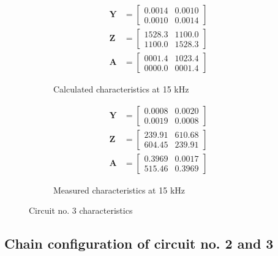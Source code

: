 \documentclass[notitlepage, a4paper, 11pt]{article}
\begin{document}
\begin{figure}[H]
		\begin{subfigure}{0.45\textwidth}
			\begin{align*}
				\mathbf{Y} &= 
				\begin{bmatrix}
				    0.0014  &  0.0010 \\
					0.0010  &  0.0014
				\end{bmatrix}
				\\
				\mathbf{Z} &= 
				\begin{bmatrix}
				    1528.3   & 1100.0 \\ 
					1100.0   & 1528.3
				\end{bmatrix}
				\\
				\mathbf{A} &= 
				\begin{bmatrix}
				    0001.4 &   1023.4 \\
					0000.0  &  0001.4
				\end{bmatrix}
			\end{align*}
			\caption{Calculated characteristics at 15 kHz}
		\end{subfigure}
		\hfill
				\begin{subfigure}{0.45\textwidth}
			\begin{align*}
				\mathbf{Y} &= 
				\begin{bmatrix}
					0.0008  &  0.0020\\
					0.0019  &  0.0008
				\end{bmatrix}
				\\
				\mathbf{Z} &= 
				\begin{bmatrix}
					239.91 & 610.68\\
					604.45 & 239.91
				\end{bmatrix}
				\\
				\mathbf{A} &=
				\begin{bmatrix}
					 0.3969  &  0.0017 \\
					515.46  &  0.3969
				\end{bmatrix} 
			\end{align*}
			\caption{Measured characteristics at 15 kHz}
		\end{subfigure}
		\caption{Circuit no. 3 characteristics}
	\end{figure}
	
	\subsection{Chain configuration of circuit no. 2 and 3}
	
\end{document}

